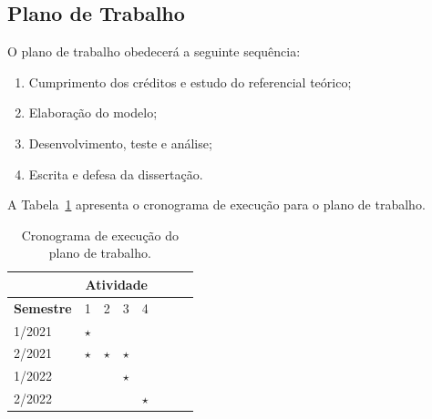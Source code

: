 \documentclass[]{preppgca}
\begin{document}
\subsection{Plano de Trabalho}

\lipsum[8]

O plano de trabalho obedecerá a seguinte sequência:

\begin{enumerate}
\item Cumprimento dos créditos e estudo do referencial teórico;
\item Elaboração do modelo;
\item Desenvolvimento, teste e análise;
\item Escrita e defesa da dissertação.
\end{enumerate}

A Tabela~\ref{tab:crono} apresenta o cronograma de execução para o
plano de trabalho.

\def\mark{$\star$}
\begin{table}[htbp]
\centering
\begin{tabular}{|l|l|l|l|l|l|l|l|}
\hline
                         & \multicolumn{4}{c|}{\textbf{Atividade}} \\ \hline
\textbf{Semestre}        & 1     & 2     & 3     &    4    \\ \hline
1/2021 & \mark &       &       &         \\ \hline
2/2021 & \mark & \mark & \mark &         \\ \hline
1/2022 &       &       & \mark &         \\ \hline
2/2022 &       &       &       &  \mark  \\ \hline
\end{tabular}
\caption{Cronograma de execução do plano de trabalho.}
\label{tab:crono}
\end{table}


\end{document}
